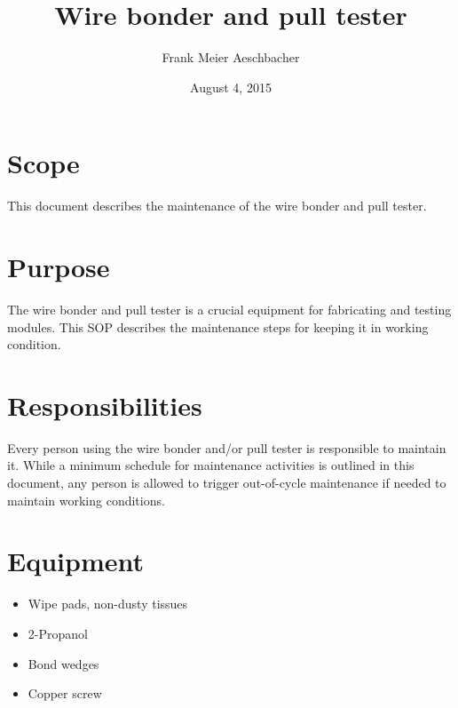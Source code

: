 \documentclass[12pt]{unlsilabsop}
\title{Wire bonder and pull tester}
\date{August 4, 2015}
\author{Frank Meier Aeschbacher}
\begin{document}
\maketitle

\section{Scope}
This document describes the maintenance of the wire bonder and pull tester.

\section{Purpose}
The wire bonder and pull tester is a crucial equipment for fabricating and testing modules. This SOP describes the maintenance steps for keeping it in working condition.


\section{Responsibilities}
Every person using the wire bonder and/or pull tester is responsible to maintain it. While a minimum schedule for maintenance activities is outlined in this document, any person is allowed to trigger out-of-cycle maintenance if needed to maintain working conditions.

\section{Equipment}

\begin{itemize}
    \item Wipe pads, non-dusty tissues
    \item 2-Propanol
    \item Bond wedges
    \item Copper screw
\end{itemize}

\end{document}
